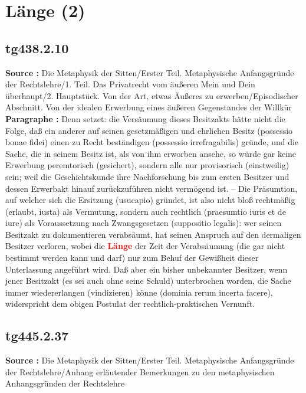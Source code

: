 \documentclass[a4paper,12pt,twoside]{book}
\newcommand{\match}[1]{\textcolor{red}{\textbf{#1}}}
\newcommand{\unnumberedsection}[1]{
	\section*{#1}
	\addcontentsline{toc}{section}{#1}
	\markright{#1}
}
\begin{document}
	\unnumberedsection{Länge (2)} 
	\subsection*{tg438.2.10} 
	\textbf{Source : }Die Metaphysik der Sitten/Erster Teil. Metaphysische Anfangsgründe der Rechtslehre/1. Teil. Das Privatrecht vom äußeren Mein und Dein überhaupt/2. Hauptstück. Von der Art, etwas Äußeres zu erwerben/Episodischer Abschnitt. Von der idealen Erwerbung eines äußeren Gegenstandes der Willkür\\  
	
	\textbf{Paragraphe : }Denn setzet: die Versäumung dieses Besitzakts hätte nicht die Folge, daß ein anderer auf seinen gesetzmäßigen und ehrlichen Besitz (possessio bonae fidei) einen zu Recht beständigen (possessio irrefragabilis) gründe, und die Sache, die in seinem Besitz ist, als von ihm erworben ansehe, so würde gar keine Erwerbung peremtorisch (gesichert), sondern alle nur provisorisch (einstweilig) sein; weil die Geschichtskunde ihre Nachforschung bis zum ersten Besitzer und dessen Erwerbakt hinauf zurückzuführen nicht vermögend  ist. – Die Präsumtion, auf welcher sich die Ersitzung (usucapio) gründet, ist also nicht bloß rechtmäßig (erlaubt, iusta) als Vermutung, sondern auch rechtlich (praesumtio iuris et de iure) als Voraussetzung nach Zwangsgesetzen (suppositio legalis): wer seinen Besitzakt zu dokumentieren verabsäumt, hat seinen Anspruch auf den dermaligen Besitzer verloren, wobei die \match{Länge} der Zeit der Verabsäumung (die gar nicht bestimmt werden kann und darf) nur zum Behuf der Gewißheit dieser Unterlassung angeführt wird. Daß aber ein bisher unbekannter Besitzer, wenn jener Besitzakt (es sei auch ohne seine Schuld) unterbrochen worden, die Sache immer wiedererlangen (vindizieren) könne (dominia rerum incerta facere), widerspricht dem obigen Postulat der rechtlich-praktischen Vernunft. 
	
	\subsection*{tg445.2.37} 
	\textbf{Source : }Die Metaphysik der Sitten/Erster Teil. Metaphysische Anfangsgründe der Rechtslehre/Anhang erläutender Bemerkungen zu den metaphysischen Anhangsgründen der Rechtslehre\\  
	
\end{document}
